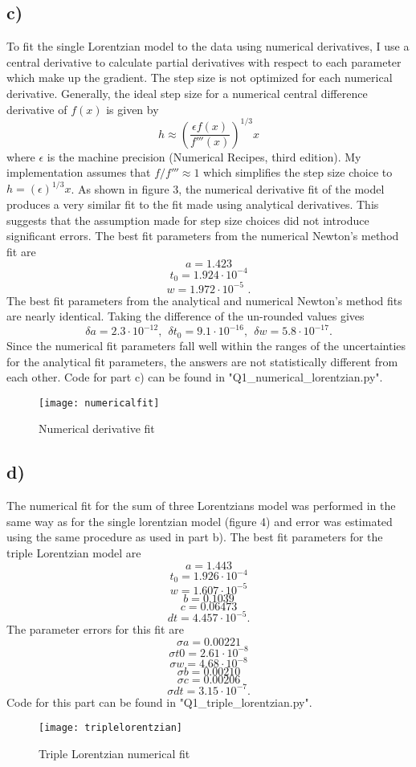 \documentclass{article}
\newcommand{\<}[1]{\left\langle #1 \right\rangle }
\begin{document}
\subsection{c)}
To fit the single Lorentzian model to the data using numerical derivatives, I use a central derivative to calculate partial derivatives with respect to each parameter which make up the gradient. The step size is not optimized for each numerical derivative. Generally, the ideal step size for a numerical central difference derivative of $f(x)$ is given by
\[h \approx \left(\frac{\epsilon f(x)}{f'''(x)}\right)^{1/3} x\]
where $\epsilon$ is the machine precision (Numerical Recipes, third edition). My implementation assumes that $f/f''' \approx 1$ which simplifies the step size choice to $h = (\epsilon)^{1/3}x$. As shown in figure 3, the numerical derivative fit of the model produces a very similar fit to the fit made using analytical derivatives. This suggests that the assumption made for step size choices did not introduce significant errors. The best fit parameters from the numerical Newton's method fit are
\[a = 1.423\]
\[t_0 = 1.924 \cdot 10^{-4}\]
\[w = 1.972 \cdot 10^{-5} \text{ .}\]
The best fit parameters from the analytical and numerical Newton's method fits are nearly identical. Taking the difference of the un-rounded values gives
\[\delta a = 2.3 \cdot 10^{-12}, \ \ \delta t_0 = 9.1\cdot 10^{-16}, \ \ \delta w = 5.8 \cdot 10^{-17} .\]
Since the numerical fit parameters fall well within the ranges of the uncertainties for the analytical fit parameters, the answers are not statistically different from each other. Code for part c) can be found in "Q1\_numerical\_lorentzian.py".
\begin{figure}[h]
	\caption{Numerical derivative fit}
	\centering
	\texttt{[image: numericalfit]}
\end{figure}

\subsection{d)}
The numerical fit for the sum of three Lorentzians model was performed in the same way as for the single lorentzian model (figure 4) and error was estimated using the same procedure as used in part b). The best fit parameters for the triple Lorentzian model are
\[a = 1.443\]
\[t_0 = 1.926\cdot 10^{-4} \]
\[w = 1.607\cdot 10^{-5}\]
\[b = 0.1039\]
\[c = 0.06473\]
\[dt = 4.457\cdot 10^{-5} .\]
The parameter errors for this fit are
\[\sigma a = 0.00221\]
\[\sigma t0 = 2.61 \cdot 10^{-8}\]
\[\sigma w = 4.68 \cdot 10^{-8}\]
\[\sigma b = 0.00210\]
\[\sigma c = 0.00206\]
\[\sigma dt = 3.15 \cdot 10^{-7}.\]
Code for this part can be found in "Q1\_triple\_lorentzian.py".
\begin{figure}[h]
	\caption{Triple Lorentzian numerical fit}
	\centering
	\texttt{[image: triplelorentzian]}
\end{figure}
\end{document}
